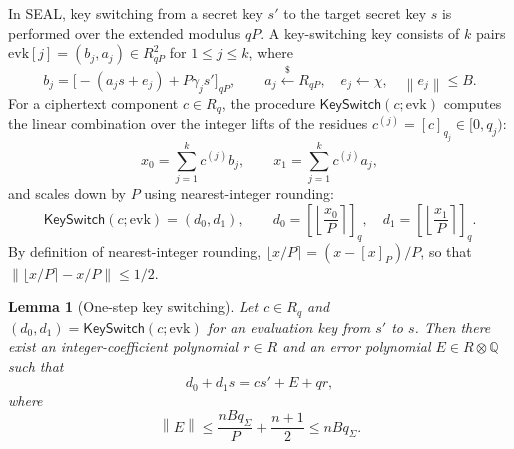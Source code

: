 \documentclass[11pt]{article}
\newtheorem{lemma}{Lemma}
\theoremstyle{definition}
\theoremstyle{remark}
\newcommand{\norm}[1]{\left\lVert #1\right\rVert}
\newcommand{\KS}{\mathsf{KeySwitch}}
\begin{document}
In SEAL, key switching from a secret key $s'$ to the target secret key $s$ is performed over the extended modulus $qP$.
A key-switching key consists of $k$ pairs $\mathrm{evk}[j] = (b_j, a_j) \in R_{qP}^2$ for $1 \leq j \leq k$, where
\[
  b_j = \bigl[-(a_j s + e_j) + P\gamma_j s'\bigr]_{qP}, \qquad a_j \xleftarrow{\$} R_{qP}, \quad e_j \leftarrow \chi, \quad \norm{e_j} \leq B.
\]
For a ciphertext component $c \in R_q$, the procedure $\KS(c; \mathrm{evk})$ computes the linear combination over the integer lifts of the residues $c^{(j)} = [c]_{q_j} \in [0, q_j)$:
\[
  x_0 = \sum_{j=1}^k c^{(j)} b_j, \qquad x_1 = \sum_{j=1}^k c^{(j)} a_j,
\]
and scales down by $P$ using nearest-integer rounding:
\[
  \KS(c; \mathrm{evk}) = (d_0, d_1), \qquad d_0 = \left[\left\lfloor \frac{x_0}{P} \right\rceil\right]_q, \quad d_1 = \left[\left\lfloor \frac{x_1}{P} \right\rceil\right]_q.
\]
By definition of nearest-integer rounding, $\lfloor x/P \rceil = (x - [x]_P)/P$, so that $\norm{\lfloor x/P \rceil - x/P} \leq 1/2$.

\begin{lemma}[One-step key switching]\label{lem:ks}
Let $c \in R_q$ and $(d_0, d_1) = \KS(c; \mathrm{evk})$ for an evaluation key from $s'$ to $s$.
Then there exist an integer-coefficient polynomial $r \in R$ and an error polynomial $E \in R \otimes \mathbb{Q}$ such that
\[
  d_0 + d_1 s = c s' + E + q r,
\]
where
\[
  \norm{E} \leq \frac{n B q_\Sigma}{P} + \frac{n+1}{2} \leq n B q_\Sigma.
\]
\end{lemma}
\end{document}

